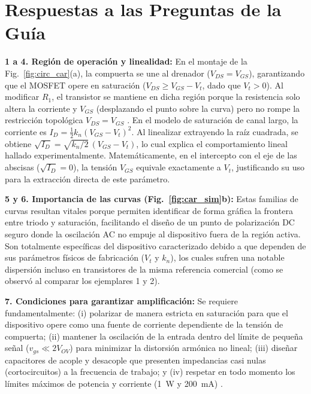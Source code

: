 \documentclass[conference]{IEEEtran}
\newcommand{\Vov}{V_{OV}}
\begin{document}
\section{Respuestas a las Preguntas de la Guía}
\label{sec:preguntas}
\textbf{1 a 4. Región de operación y linealidad:} En el montaje de la Fig.~\ref{fig:circ_car}(a), la compuerta se une al drenador ($V_{DS}=V_{GS}$), garantizando que el MOSFET opere en saturación ($V_{DS} \ge V_{GS}-V_t$, dado que $V_t>0$). Al modificar $R_1$, el transistor se mantiene en dicha región porque la resistencia solo altera la corriente y $V_{GS}$ (desplazando el punto sobre la curva) pero no rompe la restricción topológica $V_{DS}=V_{GS}$ \cite{sedra}. En el modelo de saturación de canal largo, la corriente es $I_D = \frac{1}{2} k_n (V_{GS} - V_t)^2$. Al linealizar extrayendo la raíz cuadrada, se obtiene $\sqrt{I_D} = \sqrt{k_n/2} \, (V_{GS} - V_t)$, lo cual explica el comportamiento lineal hallado experimentalmente. Matemáticamente, en el intercepto con el eje de las abscisas ($\sqrt{I_D} = 0$), la tensión $V_{GS}$ equivale exactamente a $V_t$, justificando su uso para la extracción directa de este parámetro.

\textbf{5 y 6. Importancia de las curvas (Fig.~\ref{fig:car_sim}b):} Estas familias de curvas resultan vitales porque permiten identificar de forma gráfica la frontera entre triodo y saturación, facilitando el diseño de un punto de polarización DC seguro donde la oscilación AC no empuje al dispositivo fuera de la región activa. Son totalmente específicas del dispositivo caracterizado debido a que dependen de sus parámetros físicos de fabricación ($V_t$ y $k_n$), los cuales sufren una notable dispersión incluso en transistores de la misma referencia comercial (como se observó al comparar los ejemplares 1 y 2).

\textbf{7. Condiciones para garantizar amplificación:} Se requiere fundamentalmente: (i) polarizar de manera estricta en saturación para que el dispositivo opere como una fuente de corriente dependiente de la tensión de compuerta; (ii) mantener la oscilación de la entrada dentro del límite de pequeña señal ($v_{gs} \ll 2\Vov$) para minimizar la distorsión armónica no lineal; (iii) diseñar capacitores de acople y desacople que presenten impedancias casi nulas (cortocircuitos) a la frecuencia de trabajo; y (iv) respetar en todo momento los límites máximos de potencia y corriente (\SI{1}{W} y \SI{200}{mA}) \cite{sedra, datasheet}.
\end{document}
